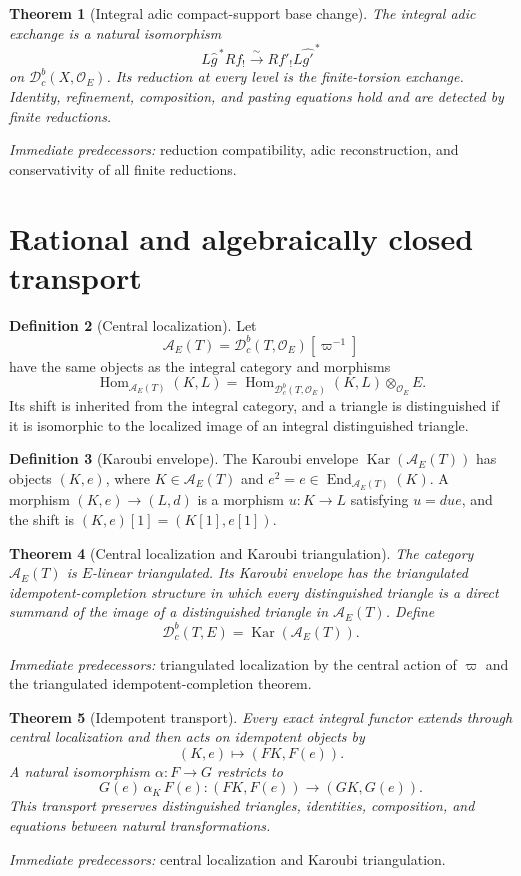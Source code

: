 \documentclass[10pt]{article}
\newtheorem{theorem}{Theorem}[section]
\theoremstyle{definition}
\newtheorem{definition}[theorem]{Definition}
\newcommand{\Dbc}{\mathcal D^b_c}
\newcommand{\Kar}{\operatorname{Kar}}
\newcommand{\Hom}{\operatorname{Hom}}
\newcommand{\pred}[1]{\par\smallskip\begingroup\footnotesize\raggedright
\emph{Immediate predecessors:} #1.\par\endgroup}
\begin{document}
\begin{theorem}[Integral adic compact-support base change]
The integral adic exchange is a natural isomorphism
\[
 L\widehat g^{\,*}Rf_!
 \xrightarrow{\sim}
 Rf'_!L\widehat {g'}^{\,*}
\]
on \(\Dbc(X,\mathcal O_E)\).  Its reduction at every level is the
finite-torsion exchange.  Identity, refinement, composition, and pasting
equations hold and are detected by finite reductions.
\end{theorem}
\pred{reduction compatibility, adic reconstruction, and conservativity of all finite reductions}

\section{Rational and algebraically closed transport}

\begin{definition}[Central localization]
Let
\[
 \mathcal A_E(T)=\Dbc(T,\mathcal O_E)[\varpi^{-1}]
\]
have the same objects as the integral category and morphisms
\[
 \Hom_{\mathcal A_E(T)}(K,L)=
 \Hom_{\Dbc(T,\mathcal O_E)}(K,L)\otimes_{\mathcal O_E}E.
\]
Its shift is inherited from the integral category, and a triangle is
distinguished if it is isomorphic to the localized image of an integral
distinguished triangle.
\end{definition}

\begin{definition}[Karoubi envelope]
The Karoubi envelope \(\Kar(\mathcal A_E(T))\) has objects \((K,e)\),
where \(K\in\mathcal A_E(T)\) and
\(e^2=e\in\operatorname{End}_{\mathcal A_E(T)}(K)\).  A morphism
\((K,e)\to(L,d)\) is a morphism \(u:K\to L\) satisfying \(u=due\), and
the shift is \((K,e)[1]=(K[1],e[1])\).
\end{definition}

\begin{theorem}[Central localization and Karoubi triangulation]
The category \(\mathcal A_E(T)\) is \(E\)-linear triangulated.  Its
Karoubi envelope has the triangulated idempotent-completion structure in
which every distinguished triangle is a direct summand of the image of a
distinguished triangle in \(\mathcal A_E(T)\).  Define
\[
 \Dbc(T,E)=\Kar(\mathcal A_E(T)).
\]
\end{theorem}
\pred{triangulated localization by the central action of \(\varpi\) and the triangulated idempotent-completion theorem}

\begin{theorem}[Idempotent transport]
Every exact integral functor extends through central localization and then
acts on idempotent objects by
\[
 (K,e)\longmapsto(FK,F(e)).
\]
A natural isomorphism \(\alpha:F\to G\) restricts to
\[
 G(e)\,\alpha_K\,F(e):(FK,F(e))\longrightarrow(GK,G(e)).
\]
This transport preserves distinguished triangles, identities,
composition, and equations between natural transformations.
\end{theorem}
\pred{central localization and Karoubi triangulation}
\end{document}

